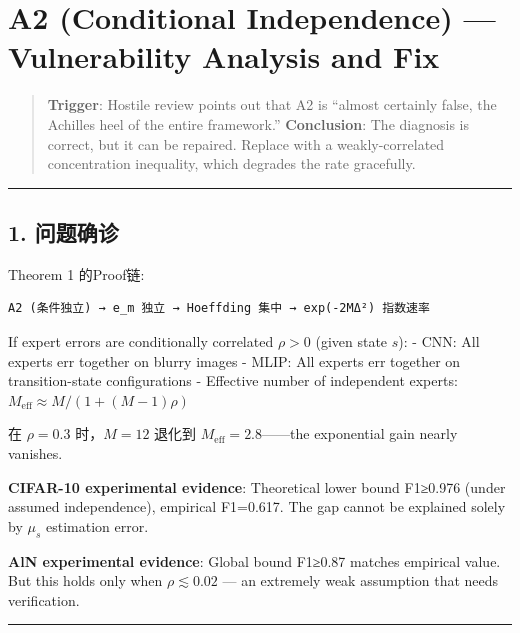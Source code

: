 \documentclass[
  12pt,
]{ctexart}
\author{SCX}
\date{2026}
\begin{document}
\section{A2 (Conditional Independence) --- Vulnerability Analysis and
Fix}\label{a2-conditional-independence-vulnerability-analysis-and-fix}

\begin{quote}
\textbf{Trigger}: Hostile review points out that A2 is ``almost certainly false, the Achilles heel of the entire framework.'' \textbf{Conclusion}:
The diagnosis is correct, but it can be repaired. Replace with a weakly-correlated concentration inequality, which degrades the rate gracefully.
\end{quote}

\begin{center}\rule{0.5\linewidth}{0.5pt}\end{center}

\subsection{1. 问题确诊}\label{ux95eeux9898ux786eux8bca}

Theorem 1 的Proof链:

\begin{verbatim}
A2 (条件独立) → e_m 独立 → Hoeffding 集中 → exp(-2MΔ²) 指数速率
\end{verbatim}

If expert errors are conditionally correlated \(\rho > 0\) (given state \(s\)): - CNN:
All experts err together on blurry images - MLIP: All experts err together on transition-state configurations -
Effective number of independent experts: \(M_{\text{eff}} \approx M / (1 + (M-1)\rho)\)

在 \(\rho = 0.3\) 时，\(M=12\) 退化到
\(M_{\text{eff}} = 2.8\)------the exponential gain nearly vanishes.

\textbf{CIFAR-10 experimental evidence}: Theoretical lower bound F1≥0.976 (under assumed independence), empirical
F1=0.617. The gap cannot be explained solely by \(\mu_s\) estimation error.

\textbf{AlN experimental evidence}: Global bound F1≥0.87 matches empirical value. But this holds only when
\(\rho \lesssim 0.02\) --- an extremely weak assumption that needs verification.

\begin{center}\rule{0.5\linewidth}{0.5pt}\end{center}
\end{document}
